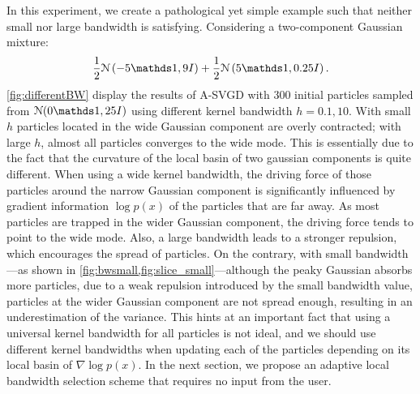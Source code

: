 

In this experiment, we create a pathological yet simple example such that neither small nor large bandwidth is satisfying.  
Considering a two-component Gaussian mixture:
\[
\frac{1}{2}\distNorm\left( -5 \ind, 9I \right)  + \frac{1}{2}\distNorm\left( 5\ind, 0.25I \right).
\]
\cref{fig:differentBW} display the results of A-SVGD with $300$ initial particles sampled from $\distNorm(0\ind, 25I )$ using different kernel bandwidth $h = 0.1, 10$. With small $h$ particles located in the wide Gaussian component are overly contracted; with large $h$, almost all particles converges to the wide mode.
This is essentially due to the fact that the curvature of the local basin of two gaussian components is quite different. When using a wide kernel bandwidth, the driving force of those particles around the narrow Gaussian component is significantly influenced by gradient information $\log p(x)$ of the particles that are far away. As most particles are trapped in the wider Gaussian component, the driving force tends to point to the wide mode. Also, a large bandwidth leads to a stronger repulsion, which encourages the spread of particles. On the contrary, with small bandwidth---as shown in \cref{fig:bwsmall,fig:slice_small}---although the peaky Gaussian absorbs more particles, due to a weak repulsion introduced by the small bandwidth value,  particles at the wider Gaussian component are not spread enough, resulting in an underestimation of the variance. 
This hints at an important fact that using a universal kernel bandwidth for all particles is not ideal, and we should use different kernel bandwidths when updating each of the particles depending on its local basin of $\nabla \log p(x)$. In the next section, we propose an adaptive local bandwidth selection scheme that requires no input from the user. 




